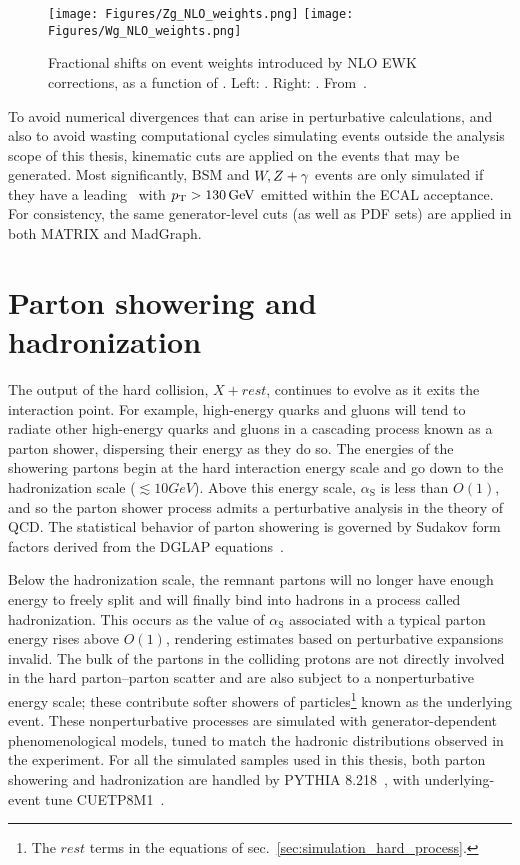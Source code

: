 \begin{figure}[hbtp]
  \begin{center}
    \texttt{[image: Figures/Zg\_NLO\_weights.png]}
    \texttt{[image: Figures/Wg\_NLO\_weights.png]}
    \caption{
    Fractional shifts on event weights introduced by NLO EWK corrections, as a function of \pTgamma. Left: \zinvg. Right: \wlng. From~\cite{ref:JHEP04(2015)018, ref:JHEP02(2016)057}.
    }
    \label{fig:NLO_EWK_weights}
  \end{center}
\end{figure}

To avoid numerical divergences that can arise in perturbative calculations, and also to avoid wasting computational cycles simulating events outside the analysis scope of this
thesis, kinematic cuts are applied on the events that may be generated. Most significantly, BSM and $\PW,\PZ + \Pgamma$ events are only simulated if they have a leading
\Pgamma\ with $\pT > 130\unit{GeV}$ emitted within the ECAL acceptance. For consistency, the same generator-level cuts (as well as PDF sets) are applied in both MATRIX and MadGraph.

\section{Parton showering and hadronization} \label{sec:simulation_parton_shower_hadronization}
The output of the hard collision, $X + rest$, continues to evolve as it exits the interaction point.
For example, high-energy quarks and gluons will tend to radiate other high-energy quarks and gluons in a cascading process
known as a parton shower, dispersing their energy as they do so. The energies of the showering partons begin at the hard interaction energy scale
and go down to the hadronization scale (${\lesssim}10\unit{GeV}$). Above this energy scale, $\alpha_\mathrm{S}$ is less than $O(1)$, and so the parton
shower process admits a perturbative analysis in the theory of QCD.
The statistical behavior of parton showering is governed by Sudakov form factors derived from the DGLAP equations~\cite{ref:0034-4885/70/1/R02}.

Below the hadronization scale, the remnant partons will no longer have enough energy to freely split and will finally bind into hadrons
in a process called hadronization. This occurs as the value of $\alpha_\mathrm{S}$ associated with a typical parton energy rises above $O(1)$, rendering estimates
based on perturbative expansions invalid. The bulk of the partons in the colliding protons are not directly involved in the hard parton--parton scatter and are also subject
to a nonperturbative energy scale; these contribute softer showers of particles\footnote{The $rest$ terms in the equations of sec.~\ref{sec:simulation_hard_process}.}
known as the underlying event.
These nonperturbative processes are simulated with generator-dependent phenomenological models, tuned to match the hadronic distributions observed in the experiment.
For all the simulated samples used in this thesis, both parton showering and hadronization are handled by PYTHIA 8.218~\cite{ref:j.cpc.2015.01.024},
with underlying-event tune CUETP8M1~\cite{ref:epjc/s10052-016-3988-x}.

